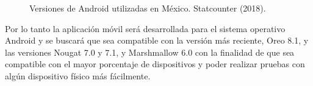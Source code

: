 \begin{figure}[htbp!]
	\centering
	\caption{Versiones de Android utilizadas en México. Statcounter (2018).}
	\label{fig:versionesAndroid}
\end{figure}

Por lo tanto la aplicación móvil será desarrollada para el sistema operativo Android y se buscará que sea compatible con la versión más reciente, Oreo 8.1, y las versiones Nougat 7.0 y 7.1, y Marshmallow 6.0 con la finalidad de que sea compatible con el mayor porcentaje de dispositivos y poder realizar pruebas con algún dispositivo físico más fácilmente. \\

\clearpage